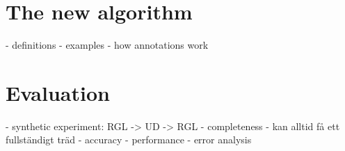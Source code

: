 \documentclass[12pt,a4paper,twoside,openright]{report}
\begin{document}


\newpage


\newpage



\newpage
\tableofcontents

\cleardoublepage
{}
\listoffigures
\cleardoublepage
{}
\listoftables


\cleardoublepage
\setcounter{page}{1}







\chapter{The new algorithm}
- definitions
- examples
- how annotations work



\chapter{Evaluation}
- synthetic experiment: RGL -> UD -> RGL
  - completeness - kan alltid få ett fullständigt träd
  - accuracy
  - performance
  - error analysis





\cleardoublepage
{} %
\printbibliography

\cleardoublepage
\appendix
\setcounter{page}{1}


\end{document}
